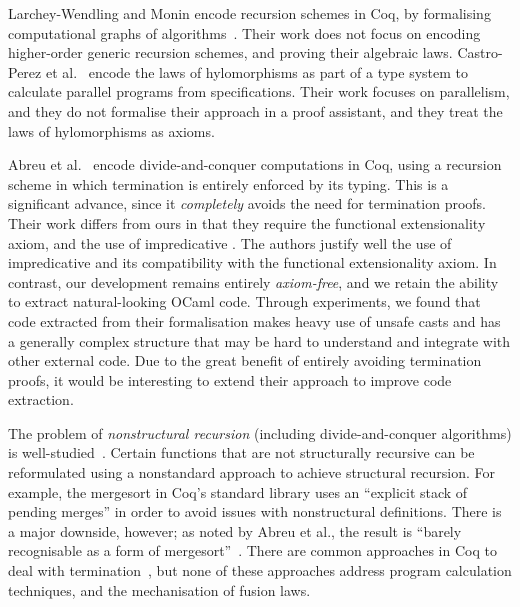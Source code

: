 \documentclass[a4paper,UKenglish,cleveref, autoref, thm-restate]{lipics-v2021}
\newcommand{\mvol}[1]{\textcolor{blue}{\textsc{Michael}: #1}}
\begin{document}
Larchey-Wendling and Monin encode recursion schemes in Coq,
by formalising computational graphs of algorithms~\cite{larchey2022braga}.
Their work does not focus on encoding higher-order generic recursion schemes,
and proving their algebraic laws. Castro-Perez et al.~\cite{farmsCastro} encode
the laws of hylomorphisms as part of a type system to calculate parallel
programs from specifications. Their work focuses on parallelism, and they do not
formalise their approach in a proof assistant, and they treat the  laws of
hylomorphisms as axioms.

Abreu et al.~\cite{AbreuDHJMS23} encode divide-and-conquer computations in Coq,
using a recursion scheme in which termination is entirely enforced by its
typing. This is a significant advance, since it \emph{completely} avoids the
need for termination proofs. Their work differs from ours in that they require
the functional extensionality axiom, and the use of impredicative . The
authors justify well the use of impredicative  and its compatibility
with the functional extensionality axiom. In contrast, our development remains
entirely \emph{axiom-free}, and we retain the ability to extract natural-looking
OCaml code.
Through experiments, we found that code extracted from their formalisation makes
heavy use of unsafe casts and has a generally complex structure that may be hard
to understand and integrate with other external code. Due to the great benefit
of entirely avoiding termination proofs, it would be interesting to extend their
approach to improve code extraction.

The problem of \emph{nonstructural recursion} (including
divide-and-conquer algorithms) is well-studied~\cite{BoveKS16}.
Certain functions that are not structurally recursive can be reformulated using
a nonstandard approach to achieve structural recursion.  For example, the
mergesort in Coq's standard library uses an ``explicit stack of pending merges''
in order to avoid issues with nonstructural definitions. There is a major
downside, however; as noted by Abreu et al., the result is ``barely recognisable
as a form of mergesort''~\cite{AbreuDHJMS23}.  There are common approaches in
Coq to deal with termination~\cite{DBLP:journals/pacmpl/SozeauM19,
  DBLP:conf/icfp/Sozeau07}, but none of these approaches address program
calculation techniques, and the mechanisation of fusion laws.
\end{document}
